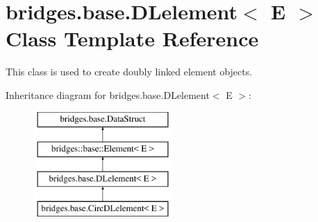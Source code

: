 \hypertarget{classbridges_1_1base_1_1_d_lelement}{}\section{bridges.\+base.\+D\+Lelement$<$ E $>$ Class Template Reference}
\label{classbridges_1_1base_1_1_d_lelement}


This class is used to create doubly linked element objects.  


Inheritance diagram for bridges.\+base.\+D\+Lelement$<$ E $>$\+:\begin{figure}[H]
\begin{center}
\leavevmode
\includegraphics[height=4.000000cm]{classbridges_1_1base_1_1_d_lelement}
\end{center}
\end{figure}
